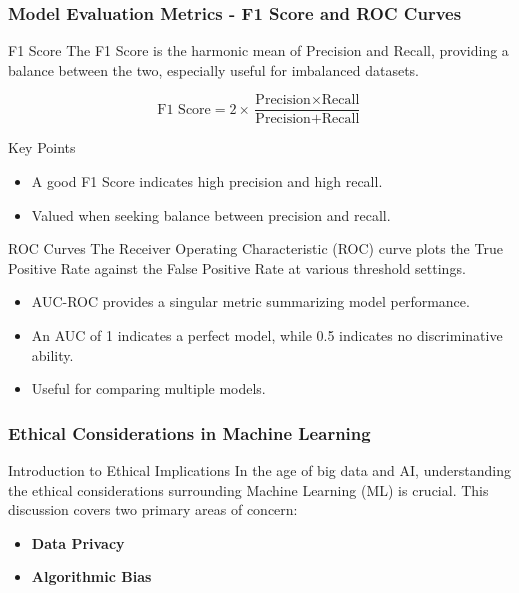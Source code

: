 \documentclass[aspectratio=169]{beamer}
\begin{document}
\begin{frame}[fragile]
    \frametitle{Model Evaluation Metrics - F1 Score and ROC Curves}
    \begin{block}{F1 Score}
        The F1 Score is the harmonic mean of Precision and Recall, providing a balance between the two, especially useful for imbalanced datasets.
    \end{block}

    \begin{equation}
        \text{F1 Score} = 2 \times \frac{\text{Precision} \times \text{Recall}}{\text{Precision} + \text{Recall}}
    \end{equation}

    \begin{block}{Key Points}
        \begin{itemize}
            \item A good F1 Score indicates high precision and high recall.
            \item Valued when seeking balance between precision and recall.
        \end{itemize}
    \end{block}

    \begin{block}{ROC Curves}
        The Receiver Operating Characteristic (ROC) curve plots the True Positive Rate against the False Positive Rate at various threshold settings.
    \end{block}

    \begin{itemize}
        \item AUC-ROC provides a singular metric summarizing model performance.
        \item An AUC of 1 indicates a perfect model, while 0.5 indicates no discriminative ability.
        \item Useful for comparing multiple models.
    \end{itemize}
\end{frame}

\begin{frame}[fragile]
    \frametitle{Ethical Considerations in Machine Learning}
    \begin{block}{Introduction to Ethical Implications}
        In the age of big data and AI, understanding the ethical considerations surrounding Machine Learning (ML) is crucial. This discussion covers two primary areas of concern: 
        \begin{itemize}
            \item \textbf{Data Privacy}
            \item \textbf{Algorithmic Bias}
        \end{itemize}
    \end{block}
\end{frame}
\end{document}

